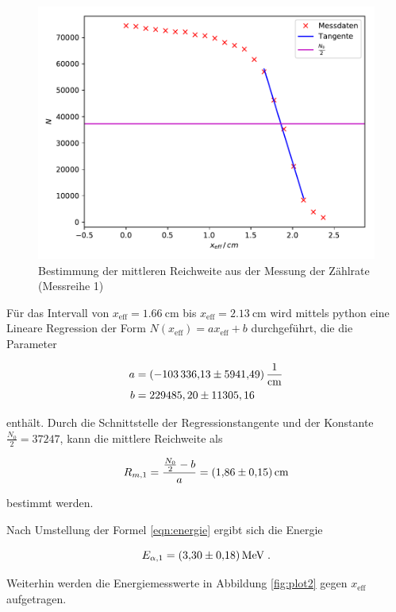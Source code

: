 \begin{figure} [H]
  \centering
  \includegraphics[scale=0.8]{content/plot1.pdf}
  \caption{Bestimmung der mittleren Reichweite aus der Messung der Zählrate (Messreihe 1)}
  \label{fig:plot1}
\end{figure}

Für das Intervall von $x_\text{eff} = \SI{1.66}{\centi\meter}$ bis $x_\text{eff} = \SI{2.13}{\centi\meter}$
wird mittels python eine Lineare Regression der Form $N(x_\text{eff}) = a x_\text{eff} + b$ durchgeführt,
die die Parameter 

\begin{align*}
    a &= \SI{- 103336.13 +- 5941.49}{\per \centi \meter} \\
    b &= 229485,20 \pm 11305,16
\end{align*}

enthält. Durch die Schnittstelle der Regressionstangente und der Konstante $\frac{N_0}{2} = 37247$,
kann die mittlere Reichweite als

\begin{equation*}
    R_{m,1} = \frac{\frac{N_0}{2} - b}{a} = \SI{1.86 +- 0.15}{\centi\meter}
\end{equation*}

bestimmt werden.

Nach Umstellung der Formel \eqref{eqn:energie} ergibt sich die Energie 

\begin{equation*}
     E_{\alpha, 1} = \SI{3.30 +- 0.18}{\mega\eV} \; .
\end{equation*}

Weiterhin werden die Energiemesswerte in Abbildung \ref{fig:plot2} gegen $x_\text{eff}$ aufgetragen.

